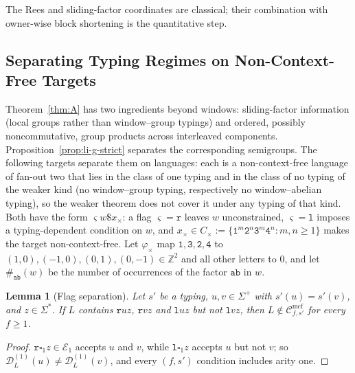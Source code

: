 \documentclass[11pt]{article}
\numberwithin{equation}{section}
\theoremstyle{plain}
\newtheorem{lemma}[theorem]{Lemma}
\theoremstyle{definition}
\theoremstyle{remark}
\newcommand{\Cmcf}[2]{\mathcal{C}^{\mathrm{mcf}}_{#1,#2}}
\newcommand{\D}{\mathcal{D}}
\newcommand{\blank}{\square}
\theoremstyle{plain}
\begin{document}
The Rees and sliding-factor coordinates are classical; their combination with
owner-wise block shortening is the quantitative step.

\subsection{Separating Typing Regimes on Non-Context-Free Targets}
\label{subsec:features-needed}

Theorem~\ref{thm:A} has two ingredients beyond windows: sliding-factor
information (local groups rather than window--group typings) and ordered,
possibly noncommutative, group products across interleaved components.
Proposition~\ref{prop:li-g-strict} separates the corresponding semigroups.  The
following targets separate them on languages: each is a non-context-free
language of fan-out two that lies in the class of one typing and in the class of
no typing of the weaker kind (no window--group typing, respectively no
window--abelian typing), so the weaker theorem does not cover it under any
typing of that kind.  Both have the form $\varsigma w\mathtt\$x_\times$: a flag
$\varsigma=\mathtt r$ leaves $w$ unconstrained, $\varsigma=\mathtt l$ imposes a
typing-dependent condition on $w$, and
$x_\times\in C_\times:=\{\mathtt{1}^m\mathtt{2}^n\mathtt{3}^m\mathtt{4}^n:m,n\ge1\}$
makes the target non-context-free.  Let $\varphi_\times$ map
$\mathtt 1,\mathtt 3,\mathtt 2,\mathtt 4$ to $(1,0),(-1,0),(0,1),(0,-1)\in\mathbb Z^2$
and all other letters to $0$, and let $\#_{\mathtt{ab}}(w)$ be the number of
occurrences of the factor $\mathtt{ab}$ in $w$.

\begin{lemma}[Flag separation]
\label{lem:flag-separation}
Let $s'$ be a typing, $u,v\in\Sigma^+$ with $s'(u)=s'(v)$, and $z\in\Sigma^*$.  If $L$
contains $\mathtt ruz$, $\mathtt rvz$ and $\mathtt luz$ but not $\mathtt lvz$, then
$L\notin\Cmcf{f}{s'}$ for every $f\ge1$.
\end{lemma}

\begin{proof}
$\mathtt r\blank_1z\in\mathcal E_1$ accepts $u$ and $v$, while $\mathtt l\blank_1z$
accepts $u$ but not $v$; so $\D^{(1)}_L(u)\ne\D^{(1)}_L(v)$, and every $(f,s')$
condition includes arity one.
\end{proof}
\end{document}
